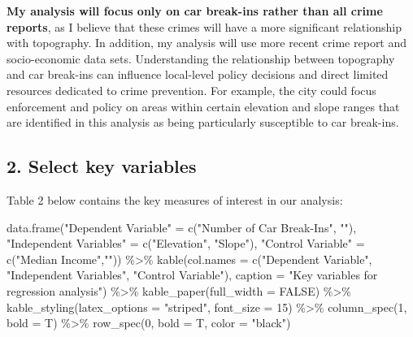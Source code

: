 \documentclass[
]{article}
\newenvironment{Shaded}{\begin{snugshade}}{\end{snugshade}}
\newcommand{\AttributeTok}[1]{\textcolor[rgb]{0.77,0.63,0.00}{#1}}
\newcommand{\ConstantTok}[1]{\textcolor[rgb]{0.00,0.00,0.00}{#1}}
\newcommand{\DecValTok}[1]{\textcolor[rgb]{0.00,0.00,0.81}{#1}}
\newcommand{\FunctionTok}[1]{\textcolor[rgb]{0.00,0.00,0.00}{#1}}
\newcommand{\NormalTok}[1]{#1}
\newcommand{\OtherTok}[1]{\textcolor[rgb]{0.56,0.35,0.01}{#1}}
\newcommand{\SpecialCharTok}[1]{\textcolor[rgb]{0.00,0.00,0.00}{#1}}
\newcommand{\StringTok}[1]{\textcolor[rgb]{0.31,0.60,0.02}{#1}}
\begin{document}
\textbf{My analysis will focus only on car break-ins rather than all
crime reports}, as I believe that these crimes will have a more
significant relationship with topography. In addition, my analysis will
use more recent crime report and socio-economic data sets. Understanding
the relationship between topography and car break-ins can influence
local-level policy decisions and direct limited resources dedicated to
crime prevention. For example, the city could focus enforcement and
policy on areas within certain elevation and slope ranges that are
identified in this analysis as being particularly susceptible to car
break-ins.

\hypertarget{select-key-variables}{%
\subsection{2. Select key variables}\label{select-key-variables}}

Table 2 below contains the key measures of interest in our analysis:

\begin{Shaded}
\begin{Highlighting}[]
\FunctionTok{data.frame}\NormalTok{(}\StringTok{"Dependent Variable"} \OtherTok{=} \FunctionTok{c}\NormalTok{(}\StringTok{"Number of Car Break{-}Ins"}\NormalTok{, }\StringTok{""}\NormalTok{),}
           \StringTok{"Independent Variables"} \OtherTok{=} \FunctionTok{c}\NormalTok{(}\StringTok{"Elevation"}\NormalTok{, }\StringTok{"Slope"}\NormalTok{), }
           \StringTok{"Control Variable"} \OtherTok{=} \FunctionTok{c}\NormalTok{(}\StringTok{"Median Income"}\NormalTok{,}\StringTok{""}\NormalTok{)) }\SpecialCharTok{\%\textgreater{}\%} 
  \FunctionTok{kable}\NormalTok{(}\AttributeTok{col.names =} \FunctionTok{c}\NormalTok{(}\StringTok{"Dependent Variable"}\NormalTok{, }\StringTok{"Independent Variables"}\NormalTok{, }\StringTok{"Control Variable"}\NormalTok{), }\AttributeTok{caption =} \StringTok{"Key variables for regression analysis"}\NormalTok{) }\SpecialCharTok{\%\textgreater{}\%}
  \FunctionTok{kable\_paper}\NormalTok{(}\AttributeTok{full\_width =} \ConstantTok{FALSE}\NormalTok{) }\SpecialCharTok{\%\textgreater{}\%}
  \FunctionTok{kable\_styling}\NormalTok{(}\AttributeTok{latex\_options =} \StringTok{"striped"}\NormalTok{,}
                \AttributeTok{font\_size =} \DecValTok{15}\NormalTok{) }\SpecialCharTok{\%\textgreater{}\%} 
  \FunctionTok{column\_spec}\NormalTok{(}\DecValTok{1}\NormalTok{, }\AttributeTok{bold =}\NormalTok{ T) }\SpecialCharTok{\%\textgreater{}\%}
  \FunctionTok{row\_spec}\NormalTok{(}\DecValTok{0}\NormalTok{, }\AttributeTok{bold =}\NormalTok{ T, }\AttributeTok{color =} \StringTok{"black"}\NormalTok{)}
\end{Highlighting}
\end{Shaded}
\end{document}
